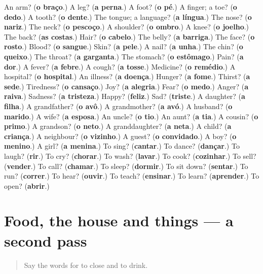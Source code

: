 \begin{tcolorbox}[breakable,colback=teal!4,colframe=teal!35!black,title={Before you move on}]
An arm? (\textbf{o braço}.) A leg? (\textbf{a perna}.) A foot? (\textbf{o pé}.) A finger; a toe? (\textbf{o dedo}.) A tooth? (\textbf{o dente}.) The tongue; a language? (\textbf{a língua}.) The nose? (\textbf{o nariz}.) The neck? (\textbf{o pescoço}.) A shoulder? (\textbf{o ombro}.) A knee? (\textbf{o joelho}.) The back? (\textbf{as costas}.) Hair? (\textbf{o cabelo}.) The belly? (\textbf{a barriga}.) The face? (\textbf{o rosto}.) Blood? (\textbf{o sangue}.) Skin? (\textbf{a pele}.) A nail? (\textbf{a unha}.) The chin? (\textbf{o queixo}.) The throat? (\textbf{a garganta}.) The stomach? (\textbf{o estômago}.) Pain? (\textbf{a dor}.) A fever? (\textbf{a febre}.) A cough? (\textbf{a tosse}.) Medicine? (\textbf{o remédio}.) A hospital? (\textbf{o hospital}.) An illness? (\textbf{a doença}.) Hunger? (\textbf{a fome}.) Thirst? (\textbf{a sede}.) Tiredness? (\textbf{o cansaço}.) Joy? (\textbf{a alegria}.) Fear? (\textbf{o medo}.) Anger? (\textbf{a raiva}.) Sadness? (\textbf{a tristeza}.) Happy? (\textbf{feliz}.) Sad? (\textbf{triste}.) A daughter? (\textbf{a filha}.) A grandfather? (\textbf{o avô}.) A grandmother? (\textbf{a avó}.) A husband? (\textbf{o marido}.) A wife? (\textbf{a esposa}.) An uncle? (\textbf{o tio}.) An aunt? (\textbf{a tia}.) A cousin? (\textbf{o primo}.) A grandson? (\textbf{o neto}.) A granddaughter? (\textbf{a neta}.) A child? (\textbf{a criança}.) A neighbour? (\textbf{o vizinho}.) A guest? (\textbf{o convidado}.) A boy? (\textbf{o menino}.) A girl? (\textbf{a menina}.) To sing? (\textbf{cantar}.) To dance? (\textbf{dançar}.) To laugh? (\textbf{rir}.) To cry? (\textbf{chorar}.) To wash? (\textbf{lavar}.) To cook? (\textbf{cozinhar}.) To sell? (\textbf{vender}.) To call? (\textbf{chamar}.) To sleep? (\textbf{dormir}.) To sit down? (\textbf{sentar}.) To run? (\textbf{correr}.) To hear? (\textbf{ouvir}.) To teach? (\textbf{ensinar}.) To learn? (\textbf{aprender}.) To open? (\textbf{abrir}.)
\end{tcolorbox}
\section[(dialogue)]{Food, the house and things — a second pass}

\label{lesson:PT-R55-second-pass-food-the-house-and-things}



\begin{quote}
Say the words for to close and to drink.
\end{quote}

